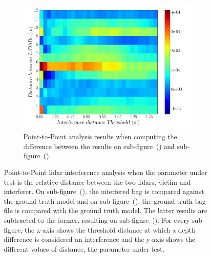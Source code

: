 \begin{figure}[!ht]
\begin{subfigure}[c]{0.45\textwidth}
	\label{fig:distance:ground-truth-color-mesh}
\end{subfigure}
\\ \vspace{4mm}
\begin{subfigure}[c]{0.8\textwidth}
	\includegraphics[width=\textwidth]{img/lidar-interference/distance/difference_ground_truth_interference_measurement.png}
	\caption{Point-to-Point analysis results when computing the difference between the results on sub-figure~() and sub-figure~().}
	\label{fig:distance:difference-color-mesh}
\end{subfigure}

\caption{Point-to-Point \ac{lidar} interference analysis when the parameter under test is the relative distance between the two \acp{lidar}, victim and interferer. On sub-figure~(), the interfered bag is compared against the ground truth model and on sub-figure~(), the ground truth bag file is compared with the ground truth model. The latter results are subtracted to the former, resulting on sub-figure~(). For every sub-figure, the x-axis shows the threshold distance at which a depth difference is considered an interference and the y-axis shows the different values of distance, the parameter under test.}
\label{fig:distance:color-mesh}
\end{figure}

